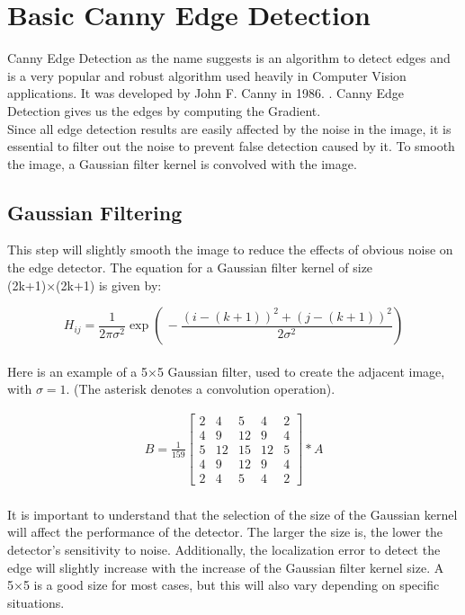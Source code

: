 \documentclass{article}
\begin{document}
\clearpage
\section{Basic Canny Edge Detection}
Canny Edge Detection as the name suggests is an algorithm to detect edges and is a very popular and 
robust algorithm used heavily in Computer Vision applications. It was developed by John F. Canny in 1986. 
\cite{canny-edge-detection}. Canny Edge Detection gives us the edges by computing the Gradient. \\

Since all edge detection results are easily affected by the noise in the image, it is essential to filter 
out the noise to prevent false detection caused by it. To smooth the image, a Gaussian filter kernel is 
convolved with the image. \\

\subsection{Gaussian Filtering}

This step will slightly smooth the image to reduce the effects of obvious noise 
on the edge detector. The equation for a Gaussian filter kernel of size (2k+1)×(2k+1) is given by:

\begin{equation*}
    H_{ij} = \frac{1}{2 \pi \sigma^2} \exp \left (\, - \frac{(i - (k + 1))^2 + (j - (k + 1))^2}{2 \sigma^2} \right )
\end{equation*} \\

Here is an example of a 5×5 Gaussian filter, used to create the adjacent image, with $\sigma  = 1$. (The asterisk denotes a convolution operation).

\begin{align*}
    B = \frac{1}{159}
    \begin{bmatrix}
        2 & 4 & 5 & 4 & 2 \\
        4 & 9 & 12 & 9 & 4 \\
        5 & 12 & 15 & 12 & 5 \\
        4 & 9 & 12 & 9 & 4 \\
        2 & 4 & 5 & 4 & 2 
    \end{bmatrix} * A
\end{align*} \\

It is important to understand that the selection of the size of the Gaussian kernel will affect the 
performance of the detector. The larger the size is, the lower the detector's sensitivity to noise. 
Additionally, the localization error to detect the edge will slightly increase with the increase of the 
Gaussian filter kernel size. A 5×5 is a good size for most cases, but this will also vary depending on 
specific situations. \\
\end{document}
